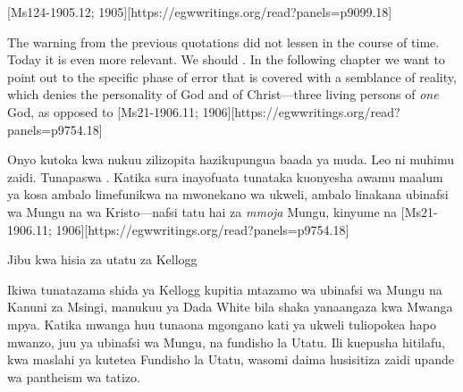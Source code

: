 [Ms124-1905.12; 1905][https://egwwritings.org/read?panels=p9099.18]


The warning from the previous quotations did not lessen in the course of time. Today it is even more relevant. We should . In the following chapter we want to point out to the specific phase of error that is covered with a semblance of reality, which denies the personality of God and of Christ—three living persons of \textit{one} God, as opposed to [Ms21-1906.11; 1906][https://egwwritings.org/read?panels=p9754.18]


Onyo kutoka kwa nukuu zilizopita hazikupungua baada ya muda. Leo ni muhimu zaidi. Tunapaswa . Katika sura inayofuata tunataka kuonyesha awamu maalum ya kosa ambalo limefunikwa na mwonekano wa ukweli, ambalo linakana ubinafsi wa Mungu na wa Kristo—nafsi tatu hai za \textit{mmoja} Mungu, kinyume na [Ms21-1906.11; 1906][https://egwwritings.org/read?panels=p9754.18]







Jibu kwa hisia za utatu za Kellogg

Ikiwa tunatazama shida ya Kellogg kupitia mtazamo wa ubinafsi wa Mungu na Kanuni za Msingi, manukuu ya Dada White bila shaka yanaangaza kwa Mwanga mpya. Katika mwanga huu tunaona mgongano kati ya ukweli tuliopokea hapo mwanzo, juu ya ubinafsi wa Mungu, na fundisho la Utatu. Ili kuepusha hitilafu, kwa maslahi ya kutetea Fundisho la Utatu, wasomi daima husisitiza zaidi upande wa pantheism wa tatizo.
